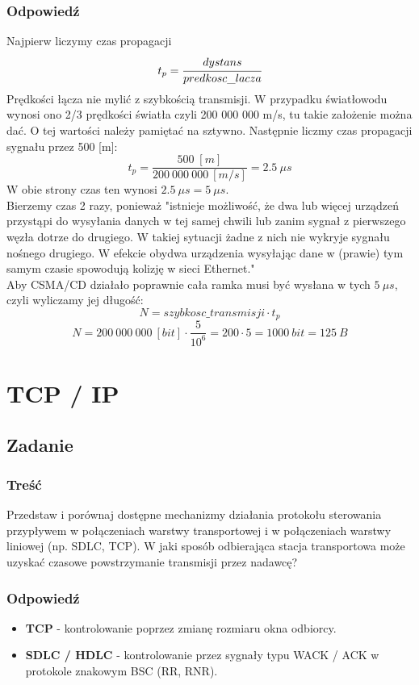 		\subsubsection{Odpowiedź}
			Najpierw liczymy czas propagacji $$ t_p = \cfrac{dystans}{predkosc\_lacza} $$
			Prędkości łącza nie mylić z szybkością transmisji. W przypadku światłowodu wynosi ono 2/3 prędkości światła czyli 200 000 000 m/s, tu takie założenie można dać. O tej wartości należy pamiętać na sztywno. Następnie liczmy czas propagacji sygnału przez 500 [m]:
			$$ t_p=\frac{500\;[m]}{200\:000\:000\:[m/s]}=2.5\:\mu s $$
			W obie strony czas ten wynosi $ 2.5\:\mu s = 5\:\mu s$.\\
			Bierzemy czas 2 razy, ponieważ "istnieje możliwość, że dwa lub więcej urządzeń przystąpi do wysyłania danych w tej samej chwili lub zanim sygnał z pierwszego węzła dotrze do drugiego. W takiej sytuacji żadne z nich nie wykryje sygnału nośnego drugiego. W efekcie obydwa urządzenia wysyłając dane w (prawie) tym samym czasie spowodują kolizję w sieci Ethernet."\\
			Aby CSMA/CD działało poprawnie cała ramka musi być wysłana w tych $5\:\mu s$, czyli wyliczamy jej długość:
			$$ N=szybkosc\_transmisji\cdot t_p $$
			$$ N=200\:000\:000\:[bit]\cdot \frac{5}{10^6} =200\cdot5=1000\:bit=125\:B $$
			
\section{TCP / IP}
\subsection{Zadanie}
	\subsubsection{Treść}
		Przedstaw i porównaj dostępne mechanizmy działania protokołu sterowania przypływem w połączeniach warstwy transportowej i w połączeniach warstwy liniowej (np. SDLC, TCP). W jaki sposób odbierająca stacja transportowa może uzyskać czasowe powstrzymanie transmisji przez nadawcę?
	\subsubsection{Odpowiedź}
		\begin{itemize}
			\item \textbf{TCP} - kontrolowanie poprzez zmianę rozmiaru okna odbiorcy.
			\item \textbf{SDLC / HDLC} - kontrolowanie przez sygnały typu WACK / ACK w protokole znakowym BSC (RR, RNR).
		\end{itemize}

